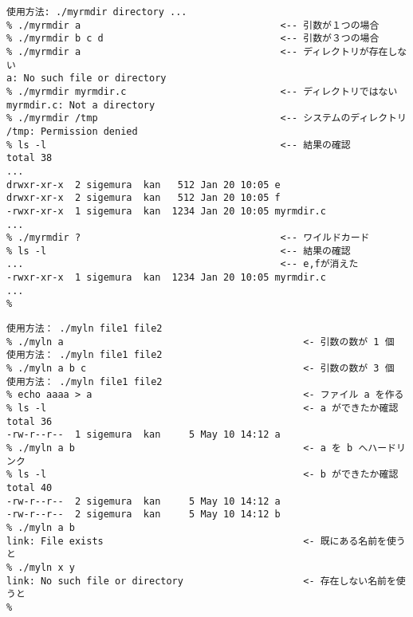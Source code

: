 \documentclass[a4j,twcolumn,11pt,nomag]{ltjarticle}      %
\begin{document}
\begin{enumerate}
\begin{lstlisting}[caption=myrmdirの実行例（動作テスト！！）]
% ./myrmdir                                     <-- 引数がない場合
使用方法: ./myrmdir directory ...
% ./myrmdir a                                   <-- 引数が１つの場合
% ./myrmdir b c d                               <-- 引数が３つの場合
% ./myrmdir a                                   <-- ディレクトリが存在しない
a: No such file or directory
% ./myrmdir myrmdir.c                           <-- ディレクトリではない
myrmdir.c: Not a directory
% ./myrmdir /tmp                                <-- システムのディレクトリ
/tmp: Permission denied
% ls -l                                         <-- 結果の確認
total 38
...
drwxr-xr-x  2 sigemura  kan   512 Jan 20 10:05 e
drwxr-xr-x  2 sigemura  kan   512 Jan 20 10:05 f
-rwxr-xr-x  1 sigemura  kan  1234 Jan 20 10:05 myrmdir.c
...
% ./myrmdir ?                                   <-- ワイルドカード
% ls -l                                         <-- 結果の確認
...                                             <-- e,fが消えた
-rwxr-xr-x  1 sigemura  kan  1234 Jan 20 10:05 myrmdir.c
...
%
\end{lstlisting}

\begin{lstlisting}[caption=mylnの実行例（動作テスト！！）]
% ./myln                                            <- 引数の数が 0 個
使用方法： ./myln file1 file2
% ./myln a                                          <- 引数の数が 1 個
使用方法： ./myln file1 file2
% ./myln a b c                                      <- 引数の数が 3 個
使用方法： ./myln file1 file2
% echo aaaa > a                                     <- ファイル a を作る
% ls -l                                             <- a ができたか確認
total 36
-rw-r--r--  1 sigemura  kan     5 May 10 14:12 a
% ./myln a b                                        <- a を b へハードリンク
% ls -l                                             <- b ができたか確認
total 40
-rw-r--r--  2 sigemura  kan     5 May 10 14:12 a
-rw-r--r--  2 sigemura  kan     5 May 10 14:12 b
% ./myln a b
link: File exists                                   <- 既にある名前を使うと
% ./myln x y
link: No such file or directory                     <- 存在しない名前を使うと
%
\end{lstlisting}
\newpage



\end{enumerate}
\end{document}
